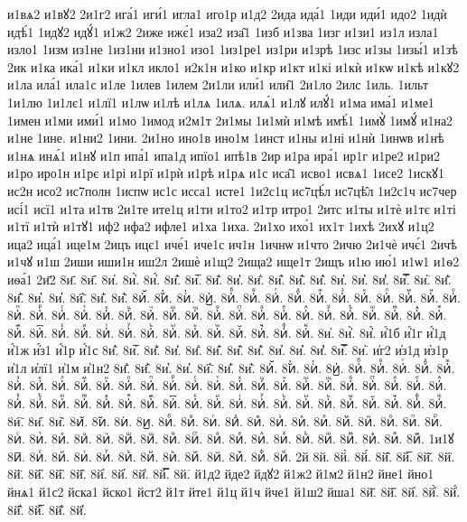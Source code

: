{и1вѧ2
и1вꙋ2
2и1г2
ига́1
иги́1
игла1
иго1р
и1д2
2ида
ида́1
1иди
иди́1
идо2
1идѝ
идѣ́1
1идꙋ2
идꙋ́1
и1ж2
2иже
ижє́1
иза2
иза̑1
1изб
и1зва
1изг
и1зи1
из1л
изла1
изло1
1изм
из1не
1из1ни
и1зно1
изо1
1из1ре1
из1ри
и1зрѣ
1изс
и1зы
1изы́1
и1зѣ
2ик
и1ка
ика́1
и1ки
и1кл
икло1
и2к1н
и1ко
и1кр
и1кт
и1кі
и1кѝ
и1кѡ
и1кѣ
и1кꙋ2
и1ла
ила́1
ила1с
и1ле
1илев
1илем
2и1ли
или́1
или̑1
2и1ло
2илс
1иль.
1ильт
1и1лю
1и1лє1
и1лї1
и1лѡ
и1лѣ
и1лѧ
1илѧ.
илѧ́1
и1лꙋ
илꙋ́1
и1ма
има́1
и1ме1
1имен
и1ми
ими́1
и1мо
1имод
и2м1т
2и1мы
1и1мѝ
и1мѣ
имѣ́1
1имꙋ̀
1имꙋ́
и1на2
и1не
1ине.
и1ни2
1ини.
2и1но
ино1в
ино1м
1инст
и1ны
и1ні
и1нѝ
1инѡв
и1нѣ
и1нѧ
инѧ́1
и1нꙋ
и1п
ипа́1
ипа1д
ипїо1
ипѣ1в
2ир
и1ра
ира́1
ир1г
и1ре2
и1ри2
и1ро
иро1н
и1рє
и1рі
и1рї
и1рѝ
и1рѣ
и1рѧ
и1с
иса̑1
исво1
исвѧ1
1исе2
1искꙋ1
ис2н
исо2
ис7полн
1испѡ
ис1с
исса1
исте1
1и2с1ц
ис7цѣ́л
ис7цѣ̑л
1и2с1ч
ис7чер
исі́1
исї1
и1та
и1тв
2и1те
ите1ц
и1ти
и1то2
и1тр
итро1
2итс
и1ты
и1тѐ
и1тє
и1ті
и1тї
и1тѝ
и1тꙋ1
иф2
ифа2
ифле1
и1ха
1иха.
2и1хо
ихо́1
их1т
1ихѣ
2ихꙋ
и1ц2
ица2
ица́1
ице1м
2ицъ
ицє1
иче́1
иче1с
ич1н
1ичнѡ
и1что
2ичю
2и1чѐ
ичє́1
2ичѣ
и1чꙋ
и1ш
2иши
иши1н
иш2л
2ишѐ
и1щ2
2ища2
ище1т
2ищъ
и1ю
ию́1
и1ѡ1
и1ѳ2
иѳа́1
2и҃2
8и҃.
8и҄.
8и҅.
8и҅̀.
8и҅́.
8и҅̂.
8и҅̅.
8и҅̆.
8и҅̇.
8и҅̈.
8и҅̋.
8и҅̏.
8и҅̑.
8и҅̓.
8и҅̔.
8и҅̾.
8и҅̿.
8и҅͘.
8и҅҃.
8и҅҄.
8и҅҅.
8и҅҆.
8и҅҇.
8и҅᷀.
8и҅᷁.
8и҅᷶.
8и᷷҅.
8и᷸҅.
8и᷹҅.
8и҅ⷠ.
8и҅ⷡ.
8и҅ⷢ.
8и҅ⷣ.
8и҅ⷤ.
8и҅ⷥ.
8и҅ⷦ.
8и҅ⷧ.
8и҅ⷨ.
8и҅ⷩ.
8и҅ⷪ.
8и҅ⷫ.
8и҅ⷬ.
8и҅ⷭ.
8и҅ⷮ.
8и҅ⷯ.
8и҅ⷰ.
8и҅ⷱ.
8и҅ⷲ.
8и҅ⷳ.
8и҅ⷴ.
8и҅ⷵ.
8и҅ⷶ.
8и҅ⷷ.
8и҅ⷸ.
8и҅ⷹ.
8и҅ⷺ.
8и҅ⷻ.
8и҅ⷼ.
8и҅ⷽ.
8и҅ⷾ.
8и҅ⷿ.
8и҅꙯.
8и҅ꙴ.
8и҅ꙵ.
8и҅ꙶ.
8и҅ꙷ.
8и҅ꙸ.
8и҅ꙹ.
8и҅ꙺ.
8и҅ꙻ.
8и҅꙼.
8и҅꙽.
8и҅ꚞ.
8и҅ꚟ.
8и҆.
8и҆̀.
8и҆́.
и҆́1б
и҆́1г
и҆́1д
и҆́1ж
и҆́з1
и҆́1р
и҆́1с
8и҆̂.
8и҆̅.
8и҆̆.
8и҆̇.
8и҆̈.
8и҆̋.
8и҆̏.
8и҆̑.
8и҆̓.
8и҆̔.
8и҆̾.
8и҆̿.
8и҆͘.
и҆г2
и҆з1д
и҆з1р
и҆1л
и҆лї1
и҆1м
и҆1н2
8и҆҃.
8и҆҄.
8и҆҅.
8и҆҆.
8и҆҇.
8и҆᷀.
8и҆᷁.
8и҆᷶.
8и᷷҆.
8и᷸҆.
8и᷹҆.
8и҆ⷠ.
8и҆ⷡ.
8и҆ⷢ.
8и҆ⷣ.
8и҆ⷤ.
8и҆ⷥ.
8и҆ⷦ.
8и҆ⷧ.
8и҆ⷨ.
8и҆ⷩ.
8и҆ⷪ.
8и҆ⷫ.
8и҆ⷬ.
8и҆ⷭ.
8и҆ⷮ.
8и҆ⷯ.
8и҆ⷰ.
8и҆ⷱ.
8и҆ⷲ.
8и҆ⷳ.
8и҆ⷴ.
8и҆ⷵ.
8и҆ⷶ.
8и҆ⷷ.
8и҆ⷸ.
8и҆ⷹ.
8и҆ⷺ.
8и҆ⷻ.
8и҆ⷼ.
8и҆ⷽ.
8и҆ⷾ.
8и҆ⷿ.
8и҆꙯.
8и҆ꙴ.
8и҆ꙵ.
8и҆ꙶ.
8и҆ꙷ.
8и҆ꙸ.
8и҆ꙹ.
8и҆ꙺ.
8и҆ꙻ.
8и҆꙼.
8и҆꙽.
8и҆ꚞ.
8и҆ꚟ.
8и҇.
8и᷀.
8и᷁.
8и᷶.
8и᷷.
8и᷸.
8и᷹.
8иⷠ.
8иⷡ.
8иⷢ.
8иⷣ.
8иⷤ.
8иⷥ.
8иⷦ.
8иⷧ.
8иⷨ.
8иⷩ.
8иⷪ.
8иⷫ.
8иⷬ.
8иⷭ.
8иⷮ.
8иⷯ.
8иⷰ.
8иⷱ.
8иⷲ.
8иⷳ.
8иⷴ.
8иⷵ.
8иⷶ.
8иⷷ.
8иⷸ.
8иⷹ.
8иⷺ.
8иⷻ.
8иⷼ.
8иⷽ.
8иⷾ.
8иⷿ.
1и1ꙋ
8и꙯.
8иꙴ.
8иꙵ.
8иꙶ.
8иꙷ.
8иꙸ.
8иꙹ.
8иꙺ.
8иꙻ.
8и꙼.
8и꙽.
8иꚞ.
8иꚟ.
2й
8й.
8й̀.
8й́.
8й̂.
8й̅.
8й̆.
8й̇.
8й̈.
8й̋.
8й̏.
8й̑.
8й̓.
8й̔.
8й̾.
8й̿.
8й͘.
й1д2
йде2
йдꙋ2
й1ж2
й1м2
й1н2
йне1
йно1
йнѧ1
й1с2
йска1
йско1
йст2
й1т
йте1
й1ц
й1ч
йче1
й1ш2
йша1
8й҃.
8й҄.
8й҅.
8й҅̀.
8й҅́.
8й҅̂.
8й҅̅.
8й҅̆.
8й҅̇.
}
